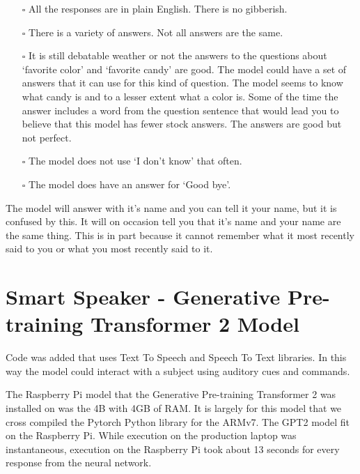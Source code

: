 \begin{itemize}
	
	\item[\rlap{\raisebox{0.3ex}{\hspace{0.4ex}\scriptsize \ding{52}}}$\square$] All the responses are in plain English. There is no gibberish.
	
	\item[\rlap{\raisebox{0.3ex}{\hspace{0.4ex}\scriptsize \ding{52}}}$\square$] There is a variety of answers. Not all answers are the same.
	
	\item[$\square$] It is still debatable weather or not the answers to the questions about `favorite color' and `favorite candy' are good. The model could have a set of answers that it can use for this kind of question. The model seems to know what candy is and to a lesser extent what a color is. Some of the time the answer includes a word from the question sentence that would lead you to believe that this model has fewer stock answers. The answers are good but not perfect.
	
	\item[\rlap{\raisebox{0.3ex}{\hspace{0.4ex}\scriptsize \ding{52}}}$\square$] The model does not use `I don't know' that often. 
	
	\item[\rlap{\raisebox{0.3ex}{\hspace{0.4ex}\scriptsize \ding{52}}}$\square$] The model does have an answer for `Good bye'.
\end{itemize}

The model will answer with it's name and you can tell it your name, but it is confused by this. It will on occasion tell you that it's name and your name are the same thing. This is in part because it cannot remember what it most recently said to you or what you most recently said to it. 

\section{Smart Speaker - Generative Pre-training Transformer 2 Model}

Code was added that uses Text To Speech and Speech To Text libraries. In this way the model could interact with a subject using auditory cues and commands.

The Raspberry Pi model that the Generative Pre-training Transformer 2 was installed on was the 4B with 4GB of RAM. It is largely for this model that we cross compiled the Pytorch Python library for the ARMv7. The GPT2 model fit on the Raspberry Pi. While execution on the production laptop was instantaneous, execution on the Raspberry Pi took about 13 seconds for every response from the neural network.

